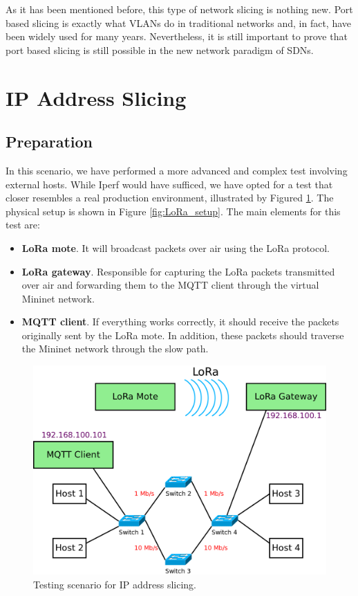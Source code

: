 As it has been mentioned before, this type of network slicing is nothing new. Port based slicing is exactly what VLANs do in traditional networks and, in fact, have been widely used for many years. Nevertheless, it is still important to prove that port based slicing is still possible in the new network paradigm of SDNs.

\section{IP Address Slicing}
\subsection{Preparation}
In this scenario, we have performed a more advanced and complex test involving external hosts. While Iperf would have sufficed, we have opted for a test that closer resembles a real production environment, illustrated by Figured \ref{fig:topology_LoRa}. The physical setup is shown in Figure \ref{fig:LoRa_setup}. The main elements for this test are:
\begin{itemize}
    \item \textbf{LoRa mote}. It will broadcast packets over air using the LoRa protocol.
    \item \textbf{LoRa gateway}. Responsible for capturing the LoRa packets transmitted over air and forwarding them to the MQTT client through the virtual Mininet network. 
    \item \textbf{MQTT client}. If everything works correctly, it should receive the packets originally sent by the LoRa mote. In addition, these packets should traverse the Mininet network through the slow path. 
\end{itemize}


\begin{figure}
  \centering
  \includegraphics[width=\linewidth]{imagenes/Testing/mininet_topology_LoRa.png}
  \caption{Testing scenario for IP address slicing.}
  \label{fig:topology_LoRa}
\end{figure}

